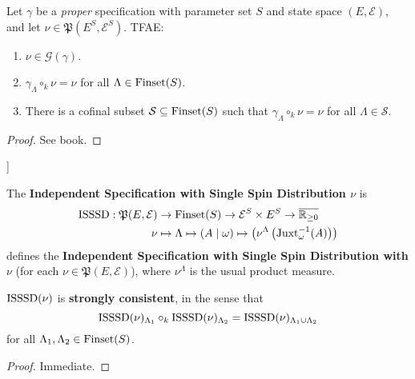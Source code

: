 \begin{lemma}
    \label{lem:gibbs-measure-char}

    Let $\gamma$ be a {\it proper} specification with parameter set $S$ and state space $(E, \mathcal{E})$, and let $\nu\in\mathfrak{P}(E^S, \mathcal{E}^S)$. TFAE:
    \begin{enumerate}
        \item $\nu\in\mathcal{G}(\gamma)$.
        \item $\gamma_\Lambda\circ_k\nu=\nu$ for all $\Lambda\in\operatorname{Finset}(S)$.
        \item There is a cofinal subset $\mathcal{S}\subseteq\operatorname{Finset}(S)$ such that $\gamma_\Lambda\circ_k\nu=\nu$ for all $\Lambda\in\mathcal{S}$.
    \end{enumerate}
\end{lemma}
\begin{proof}

  See book.
\end{proof}

\begin{definition}[Independent Specification with Single Spin Distribution [ISSSD]]
    \label{def:ISSSD}

    The \textbf{Independent Specification with Single Spin Distribution $\nu$} is
    \begin{align}
        \operatorname{ISSSD}:\mathfrak{P}(E, \mathcal{E})&\to\operatorname{Finset}(S)\to\mathcal{E}^S\times E^S\to\overline{\mathbb{R}_{\geq0}}\\
        \nu&\mapsto\Lambda\mapsto(A\mid\omega)\mapsto\left(\nu^\Lambda\left(\operatorname{Juxt}_{\omega}^{-1}(A)\right)\right)
    \end{align}
    defines the \textbf{Independent Specification with Single Spin Distribution with $\nu$} (for each $\nu\in\mathfrak{P}(E, \mathcal{E})$), where $\nu^\Lambda$ is the usual product measure.
\end{definition}

\begin{lemma}
    \label{lem:isssd-strong-consistency}
    \leanok

    $\operatorname{ISSSD}(\nu)$ is {\bf strongly consistent}, in the sense that
    $$\operatorname{ISSSD}(\nu)_{\Lambda_1} \circ_k \operatorname{ISSSD}(\nu)_{\Lambda_2} = \operatorname{ISSSD}(\nu)_{\Lambda_1 \cup \Lambda_2}$$
    for all $\Lambda_1, \Lambda_2 \in \operatorname{Finset}(S)$.
\end{lemma}
\begin{proof}

  Immediate.
\end{proof}

